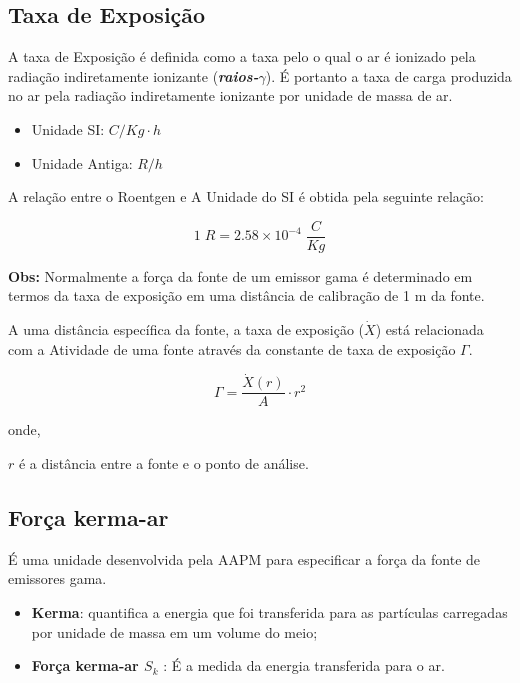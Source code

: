\documentclass[11pt,a4paper]{article}
\begin{document}
		
		\subsection{Taxa de Exposição}

			A taxa de Exposição é definida como a taxa pelo o qual o ar é ionizado pela radiação indiretamente ionizante (\textbf{\textit{\textcolor{CarnationPink}{raios-$\gamma$}}}). É portanto a taxa de carga produzida no ar pela radiação indiretamente ionizante por unidade de massa de ar.

			\begin{itemize}
				\item Unidade SI: $C/Kg\cdot h$
				\item Unidade Antiga: $R / h$
			\end{itemize}

			A relação entre o Roentgen e A Unidade do SI é obtida pela seguinte relação:

			\begin{equation}
				1\;R = 2.58 \times 10^{-4}\; \frac{C}{Kg}
			\end{equation}

			\textbf{\textcolor{CarnationPink}{Obs:} } Normalmente a força da fonte de um emissor gama é determinado em termos da taxa de exposição em uma distância de calibração de 1 m da fonte.

			A uma distância específica da fonte, a taxa de exposição (\textbf{\textit{\textcolor{CarnationPink}{$\dot{X}$}}}) está relacionada com a Atividade de uma fonte através da constante de taxa de exposição $\Gamma$.

				\begin{equation}
					\Gamma = \frac{\dot{X}(r)}{A} \cdot r^2
				\end{equation}

				onde, 

				$r$ é a distância entre a fonte e o ponto de análise.

		\subsection{Força kerma-ar}

			É uma unidade desenvolvida pela AAPM para especificar a força da fonte de emissores gama. 

			\begin{itemize}
				\item \textbf{Kerma}: quantifica a energia que foi transferida para as partículas carregadas por unidade de massa em um volume do meio;
				\item \textbf{Força kerma-ar \textbf{\textit{\textcolor{CarnationPink}{$S_k$}}} }: É a medida da energia transferida para o ar.
			\end{itemize}
\end{document}
